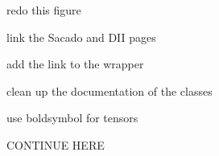 
\begin{DoxyRefList}
\item[\label{todo__todo000001}%
\hypertarget{todo__todo000001}{}%
page \hyperlink{index}{Trilinos\+:\+:Sacado example documentation} ]redo this figure

link the Sacado and D\+II pages

add the link to the wrapper

clean up the documentation of the classes

use boldsymbol for tensors

C\+O\+N\+T\+I\+N\+UE H\+E\+RE
\end{DoxyRefList}